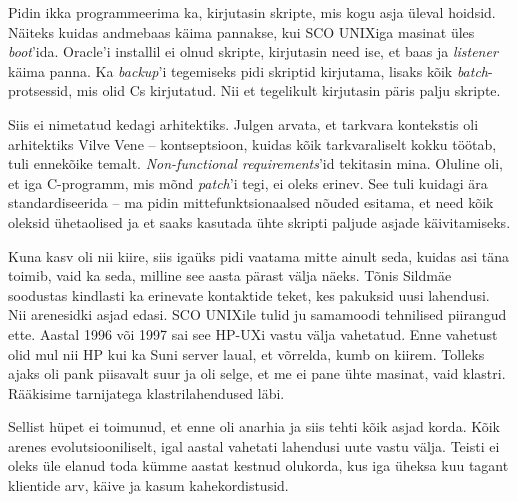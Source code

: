 
Pidin ikka programmeerima ka, kirjutasin skripte, 
mis kogu asja üleval hoidsid. Näiteks kuidas andmebaas käima pannakse, kui SCO 
UNIXiga masinat üles \emph{boot}'ida. Oracle'i installil ei olnud skripte, kirjutasin need ise, et baas ja \emph{listener} käima panna. Ka 
\emph{backup}'i tegemiseks pidi skriptid kirjutama, lisaks kõik 
\emph{batch}-protsessid, mis olid Cs kirjutatud. 
Nii et tegelikult kirjutasin päris palju skripte.


Siis ei nimetatud kedagi arhitektiks. Julgen arvata, et 
tarkvara kontekstis oli arhitektiks Vilve Vene -- kontseptsioon, kuidas kõik tarkvaraliselt kokku töötab, tuli 
ennekõike temalt. \emph{Non-functional requirements}'id tekitasin mina. 
Oluline oli, et iga C-programm, mis mõnd \emph{patch}'i tegi, ei 
oleks erinev. See tuli kuidagi ära standardiseerida -- ma pidin 
mittefunktsionaalsed nõuded esitama, et need kõik oleksid ühetaolised ja et 
saaks kasutada ühte skripti paljude asjade käivitamiseks.


Kuna kasv oli nii kiire, siis igaüks pidi vaatama mitte ainult 
seda, kuidas asi täna toimib, vaid ka seda, milline see 
aasta pärast välja näeks. Tõnis Sildmäe 
soodustas kindlasti ka erinevate kontaktide teket, kes 
pakuksid uusi lahendusi. Nii arenesidki
asjad edasi. SCO UNIXile tulid ju samamoodi tehnilised piirangud 
ette. Aastal 1996 või 1997 sai see HP-UXi vastu välja vahetatud. Enne 
vahetust olid mul nii HP kui ka Suni server laual, et võrrelda, kumb on
kiirem. Tolleks ajaks oli pank piisavalt suur ja oli selge, et me ei 
pane ühte masinat, vaid klastri. Rääkisime tarnijatega 
klastrilahendused läbi.

Sellist hüpet ei toimunud, et enne oli anarhia ja siis tehti kõik asjad 
korda. Kõik arenes evolutsiooniliselt, igal aastal vahetati lahendusi uute 
vastu välja. Teisti ei oleks üle elanud toda kümme aastat kestnud olukorda, 
kus iga üheksa kuu tagant klientide arv, käive ja
kasum kahekordistusid.

